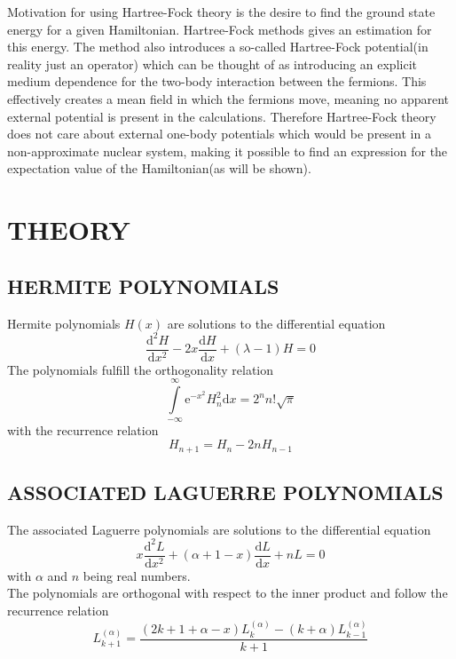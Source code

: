 \documentclass[a4paper, hidelinks, 10pt]{article}
\let\oldsection\section
\renewcommand{\section}[1]{\centering \oldsection{{#1}} \justifying}
\let\oldsubsection\subsection
\renewcommand{\subsection}[1]{\centering \oldsubsection{{#1}} \justifying}
\newcommand{\me}{\mathrm{e}} %
\newcommand{\md}{\mathrm{d}} %
\newcommand{\infint}{\int\limits^{\infty}_{-\infty}}
\begin{document}
    \noindent
    Motivation for using Hartree-Fock theory is the desire to find the ground
    state energy for a given Hamiltonian. Hartree-Fock methods gives an
    estimation for this energy. The method also introduces a so-called
    Hartree-Fock potential(in reality just an operator) which can be thought of
    as introducing an explicit medium dependence for the two-body interaction
    between the fermions. This effectively creates a mean field in which the
    fermions move, meaning no apparent external potential is present in the
    calculations. Therefore Hartree-Fock theory does not care about external
    one-body potentials which would be present in a non-approximate nuclear
    system, making it possible to find an expression for the expectation value
    of the Hamiltonian(as will be shown).

\section{THEORY}
\label{sec:theory}

\subsection{HERMITE POLYNOMIALS}
\label{sub:hermite_polynomials}
    Hermite polynomials $H(x)$ are solutions to the differential equation
        \begin{equation}
            \frac{\md^2 H}{\md x^2} -2x\frac{\md H}{\md x} + \left(\lambda
            -1\right)H = 0
            \label{eq:hermitediffeq}
        \end{equation}
    The polynomials fulfill the orthogonality relation 
        \begin{equation}
            \infint \me^{-x^2}H^2_n\md x = 2^nn!\sqrt{\pi}
            \label{eq:hermiteOrth}
        \end{equation}
    with the recurrence relation
        \begin{equation}
            H_{n+1} = H_n - 2nH_{n-1}
            \label{eq:hermiteReq}
        \end{equation}

\subsection{ASSOCIATED LAGUERRE POLYNOMIALS}
\label{sub:associated_laguerre_polynomials}
    The associated Laguerre polynomials are solutions to the differential
    equation
        \begin{equation}
            x\frac{\md^2 L}{\md x^2} + \left(\alpha + 1 -x\right)\frac{\md
            L}{\md x} + nL = 0
            \label{eq:laguerrediffeq}
        \end{equation}
    with $\alpha$ and $n$ being real numbers. \\
    The polynomials are orthogonal with respect to the inner product and follow
    the recurrence relation
        \begin{equation}
            L^{(\alpha)}_{k+1} =
            \frac{\left(2k+1+\alpha-x\right)L^{(\alpha)}_{k} -
            \left(k+\alpha\right)L^{(\alpha)}_{k-1}}{k+1}
            \label{eq:laguerreReq}
        \end{equation}
\end{document}
